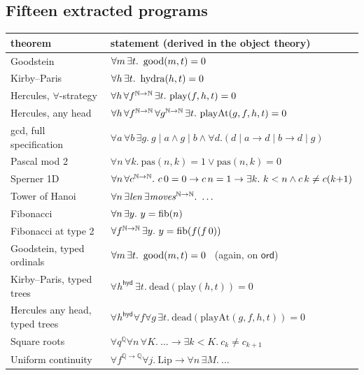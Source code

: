 \subsection*{Fifteen extracted programs}

\begin{center}\small
\begin{tabular}{ll}
\toprule
theorem & statement (derived in the object theory)\\
\midrule
Goodstein & $\forall m\,\exists t.\ \operatorname{good}(m,t)=0$\\
Kirby--Paris & $\forall h\,\exists t.\ \operatorname{hydra}(h,t)=0$\\
Hercules, $\forall$-strategy & $\forall h\,\forall f^{\Nat\to\Nat}\,\exists t.\ \mathrm{play}(f,h,t)=0$\\
Hercules, any head & $\forall h\,\forall f^{\Nat\to\Nat}\,\forall g^{\Nat\to\Nat}\,\exists t.\ \mathrm{playAt}(g,f,h,t)=0$\\
gcd, full specification & $\forall a\,\forall b\,\exists g.\ g\mid a \land g\mid b \land \forall d.(d\mid a\to d\mid b\to d\mid g)$\\
Pascal mod 2 & $\forall n\,\forall k.\ \mathrm{pas}(n,k)=1 \lor \mathrm{pas}(n,k)=0$\\
Sperner 1D & $\forall n\,\forall c^{\mathbb{N}\to\mathbb{N}}.\ c\,0=0 \to c\,n=1 \to \exists k.\ k<n \land c\,k\neq c(k{+}1)$\\
Tower of Hanoi & $\forall n\,\exists \mathit{len}\,\exists \mathit{moves}^{\Nat\to\Nat}.\ \dots$\\
Fibonacci & $\forall n\,\exists y.\ y=\operatorname{fib}(n)$\\
Fibonacci at type 2 & $\forall f^{\mathbb{N}\to\mathbb{N}}\,\exists y.\ y=\operatorname{fib}(f(f\,0))$\\
Goodstein, typed ordinals & $\forall m\,\exists t.\ \operatorname{good}(m,t)=0$ \ (again, on $\mathsf{ord}$)\\
Kirby--Paris, typed trees & $\forall h^{\mathsf{hyd}}\,\exists t.\ \mathrm{dead}(\mathrm{play}(h,t))=0$\\
Hercules any head, typed trees & $\forall h^{\mathsf{hyd}}\forall f\forall g\,\exists t.\ \mathrm{dead}(\mathrm{playAt}(g,f,h,t))=0$\\
Square roots & $\forall q^{\mathbb{Q}}\forall n\,\forall K.\ \dots \to \exists k{<}K.\ c_k \neq c_{k+1}$\\
Uniform continuity & $\forall f^{\mathbb{Q}\to\mathbb{Q}}\forall j.\ \mathrm{Lip} \to \forall n\,\exists M.\ \dots$\\
\bottomrule
\end{tabular}
\end{center}

